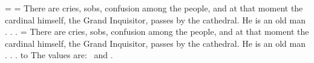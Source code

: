 \def\tstoryA{There are cries, sobs, confusion among the people, and at
that moment the cardinal himself, the Grand Inquisitor, passes by the
cathedral. He is an old man . . .}
=\hyphenchar\font
{}=\vbox{\hsize=2.25in \tstoryA}
=\vbox{\hsize=2.25in\hyphenchar{} \tstoryA}%
\hbox to %
The values are: \the{}\ and \the\hyphenchar\font.%
\hyphenchar{} %
\bye
